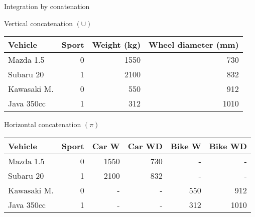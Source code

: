 \documentclass[hyperref={colorlinks=true}]{beamer}
\begin{document}
\begin{frame}{Integration by conatenation}
  \begin{block}{Vertical concatenation $(\cup)$}
    \begin{tabular}{l|r|rr}
    Vehicle & Sport & Weight (kg) & Wheel diameter (mm) \\
    \hline
    Mazda 1.5   & 0 & 1550 & 730 \\
    Subaru 20   & 1 & 2100 & 832 \\
    Kawasaki M. & 0 &  550 & 912 \\
    Java 350cc  & 1 &  312 & 1010 \\
    \hline
    \end{tabular}
  \end{block}
  \begin{block}{Horizontal concatenation $(\pi)$}
    \begin{tabular}{l|r|rrrr}
    Vehicle & Sport & Car W & Car WD & Bike W & Bike WD \\
    \hline
    Mazda 1.5   & 0 & 1550 & 730 &   - &    - \\
    Subaru 20   & 1 & 2100 & 832 &   - &    - \\
    Kawasaki M. & 0 &    - &   - & 550 &  912 \\
    Java 350cc  & 1 &    - &   - & 312 & 1010 \\
    \hline
    \end{tabular}
  \end{block}
\end{frame}
\end{document}
